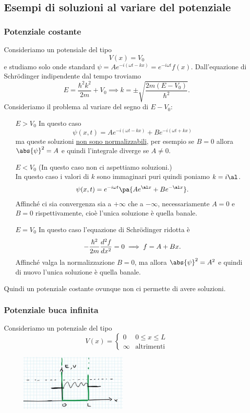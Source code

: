\subsection{Esempi di soluzioni al variare del potenziale}
\subsubsection{Potenziale costante}
Consideriamo un potensiale del tipo
\[V(x)=V_0\]
e studiamo solo onde standard $\psi=Ae^{-i(\omega t-kx)}=e^{-i\omega t}f(x)$. Dall'equazione di Schr\"odinger indipendente dal tempo troviamo
\[E=\frac{\hbar^2 k^2}{2m}+V_0\implies k=\pm\sqrt{\frac{2m(E-V_0)}{\hbar^2}}.\]
Consideriamo il problema al variare del segno di $E-V_0$:
\setlength{\leftmargini}{0cm}
\begin{itemize}
\item[$\boxed{E>V_0}$] In questo caso 
\[\psi(x,t)=Ae^{-i(\omega t-kx)}+Be^{-i(\omega t+kx)}\]
ma queste soluzioni \underline{non sono normalizzabili}, per esempio se $B=0$ allora $\abs{\psi}^2=A$ e quindi l'integrale diverge se $A\neq 0$.
\item[$\boxed{E<V_0}$] (In questo caso non ci aspettiamo soluzioni.)\\
In questo caso i valori di $k$ sono immaginari puri quindi poniamo $k=i\al$.
\[\psi(x,t)=e^{-i\omega t}\pa{Ae^{\al x}+B e^{-\al x}}.\]
Affinch\'e ci sia convergenza sia a $+\infty$ che a $-\infty$, necessariamente $A=0$ e $B=0$ rispettivamente, cio\`e l'unica soluzione \`e quella banale.
\item[$\boxed{E=V_0}$] In questo caso l'equazione di Schr\"odinger ridotta \`e
\[-\frac{\hbar^2}{2m}\dds[2]x f=0\implies f=A+Bx.\]
Affinch\'e valga la normalizzazione $B=0$, ma allora $\abs{\psi}^2=A^2$ e quindi di nuovo l'unica soluzione \`e quella banale.
\end{itemize}
\setlength{\leftmargini}{0.5cm}
Quindi un potenziale costante ovunque non ci permette di avere soluzioni.


\subsubsection{Potenziale buca infinita}
Consideriamo un potenziale del tipo
\[V(x)=\begin{cases}
0 &0\leq x\leq L\\
\infty &\text{altrimenti}
\end{cases}\]

\begin{figure}[!htb]
    \centering
    \includegraphics[width=5.4cm]{images/buca_infinita.png}
\end{figure}

